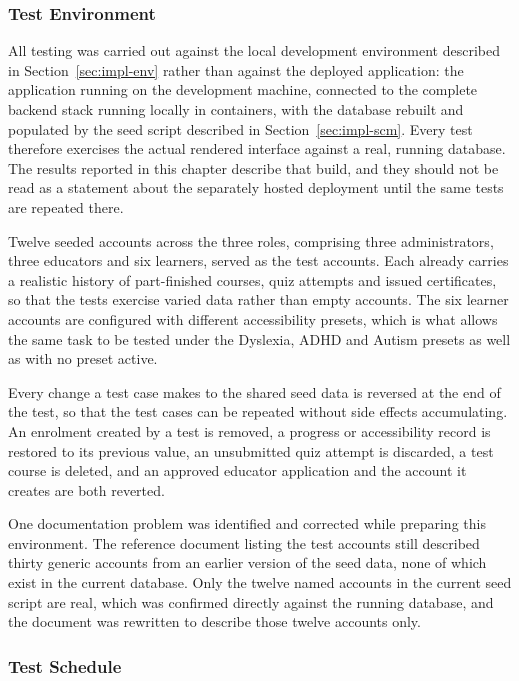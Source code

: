 \documentclass[12pt, oneside]{article} %
\begin{document}
\subsubsection{Test Environment}
\label{sec:test-env}

All testing was carried out against the local development environment described in Section~\ref{sec:impl-env} rather than against the deployed application: the application running on the development machine, connected to the complete backend stack running locally in containers, with the database rebuilt and populated by the seed script described in Section~\ref{sec:impl-scm}. Every test therefore exercises the actual rendered interface against a real, running database. The results reported in this chapter describe that build, and they should not be read as a statement about the separately hosted deployment until the same tests are repeated there.

Twelve seeded accounts across the three roles, comprising three administrators, three educators and six learners, served as the test accounts. Each already carries a realistic history of part-finished courses, quiz attempts and issued certificates, so that the tests exercise varied data rather than empty accounts. The six learner accounts are configured with different accessibility presets, which is what allows the same task to be tested under the Dyslexia, ADHD and Autism presets as well as with no preset active.

Every change a test case makes to the shared seed data is reversed at the end of the test, so that the test cases can be repeated without side effects accumulating. An enrolment created by a test is removed, a progress or accessibility record is restored to its previous value, an unsubmitted quiz attempt is discarded, a test course is deleted, and an approved educator application and the account it creates are both reverted.

One documentation problem was identified and corrected while preparing this environment. The reference document listing the test accounts still described thirty generic accounts from an earlier version of the seed data, none of which exist in the current database. Only the twelve named accounts in the current seed script are real, which was confirmed directly against the running database, and the document was rewritten to describe those twelve accounts only.

\subsubsection{Test Schedule}
\end{document}
